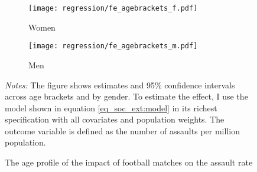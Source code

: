 \begin{figure}[t]\centering
	\begin{subfigure}[h]{0.48\linewidth}\centering\caption{Women}
		\texttt{[image: regression/fe\_agebrackets\_f.pdf]}
	\end{subfigure}
	\begin{subfigure}[h]{0.48\linewidth}\centering\caption{Men}
		\texttt{[image: regression/fe\_agebrackets\_m.pdf]}
	\end{subfigure}
	\scriptsize
	\begin{minipage}{0.95\linewidth}
		\caption{The age profile of the impact of football matches on the assault rate}\label{fig_soc_ext:fe_age_profile}
		\emph{Notes:} The figure shows estimates and 95\% confidence intervals across age brackets and by gender. To estimate the effect, I use the model shown in equation \ref{eq_soc_ext:model} in its richest specification with all covariates and population weights. The outcome variable is defined as the number of assaults per million population.
	\end{minipage}
\end{figure}